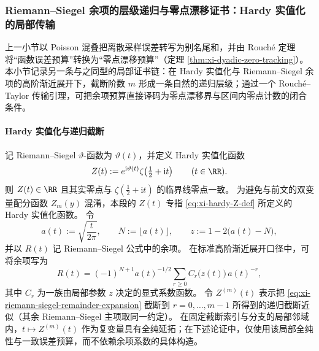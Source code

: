 \subsubsection{Riemann--Siegel 余项的层级递归与零点漂移证书：Hardy 实值化的局部传输}\label{subsubsec:xi-riemann-siegel-recursive-zero-transfer}
上一小节以 Poisson 混叠把离散采样误差转写为别名尾和，并由 Rouch\'e 定理将“函数误差预算”转换为“零点漂移预算”（定理 \ref{thm:xi-dyadic-zero-tracking}）。
本小节记录另一条与之同型的局部证书链：在 Hardy 实值化与 Riemann--Siegel 余项的高阶渐近展开下，截断阶数 \(m\) 形成一条自然的递归层级；通过一个 Rouch\'e--Taylor 传输引理，可把余项预算直接译码为零点漂移界与区间内零点计数的闭合条件。

\paragraph{Hardy 实值化与递归截断}
记 Riemann--Siegel \(\vartheta\)-函数为 \(\vartheta(t)\)，并定义 Hardy 实值化函数
\begin{equation}\label{eq:xi-hardy-Z-def}
Z(t):=e^{\mathrm{i}\vartheta(t)}\zeta\!\left(\tfrac12+\mathrm{i}t\right)\qquad (t\in\RR).
\end{equation}
则 \(Z(t)\in\RR\) 且其实零点与 \(\zeta(\tfrac12+\mathrm{i}t)\) 的临界线零点一致。
为避免与前文的双变量配分函数 \(Z_m(y)\) 混淆，本段的 \(Z(t)\) 专指 \eqref{eq:xi-hardy-Z-def} 所定义的 Hardy 实值化函数。
令
\begin{equation}\label{eq:xi-riemann-siegel-aNz}
a(t):=\sqrt{\frac{t}{2\pi}},\qquad N:=\lfloor a(t)\rfloor,\qquad z:=1-2\bigl(a(t)-N\bigr),
\end{equation}
并以 \(R(t)\) 记 Riemann--Siegel 公式中的余项。
在标准高阶渐近展开口径中，可将余项写为
\begin{equation}\label{eq:xi-riemann-siegel-remainder-expansion}
R(t)=(-1)^{N+1}a(t)^{-1/2}\sum_{r\ge 0} C_r\!\bigl(z(t)\bigr)\,a(t)^{-r},
\end{equation}
其中 \(C_r\) 为一族由局部参数 \(z\) 决定的显式系数函数。
令 \(Z^{(m)}(t)\) 表示把 \eqref{eq:xi-riemann-siegel-remainder-expansion} 截断到 \(r=0,\dots,m-1\) 所得到的递归截断近似（其余 Riemann--Siegel 主项取同一约定）。
在固定截断索引与分支的局部邻域内，\(t\mapsto Z^{(m)}(t)\) 作为复变量具有全纯延拓；在下述论证中，仅使用该局部全纯性与一致误差预算，而不依赖余项系数的具体构造。

